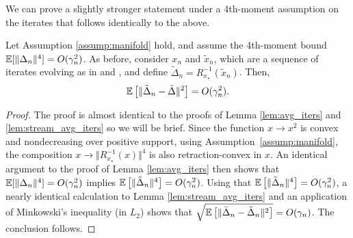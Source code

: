 We can prove a slightly stronger statement under a 4th-moment assumption on the iterates that follows identically to the above.
\begin{lemma} \label{lem:stream_avg_iters_4mom}
  Let Assumption \ref{assump:manifold} hold, and assume the 4th-moment bound $\mathbb{E}[\Vert \Delta_n \Vert^4] = O(\gamma_n^2)$. As before, consider $x_n$ and $\tilde{x}_n$, which are a sequence of iterates evolving as in   and , and define
  $\tilde {\Delta}_{n} = R_{x_\star}^{-1}(\tilde {x}_{n})$. Then,
  \[ \mathbb{E} \left[ \Vert \tilde{\Delta}_n-\bar{\Delta} \Vert^2 \right] = O(\gamma_n^2). \]
\end{lemma}
\begin{proof}
  The proof is almost identical to the proofs of Lemma \ref{lem:avg_iters} and \ref{lem:stream_avg_iters} so we will be brief. Since the function $x \to x^2$ is convex
  and nondecreasing over positive support, using Assumption~\ref{assump:manifold}, the composition $x \to \Vert R_{x_\star}^{-1}(x) \Vert^4$ is also retraction-convex in $x$. An identical argument to the proof
  of Lemma \ref{lem:avg_iters} then shows that $\mathbb{E}[\Vert \Delta_n \Vert^4] = O(\gamma_n^2)$ implies $\mathbb{E}\left[\Vert \tilde{\Delta}_n \Vert^4\right] = O(\gamma_n^2)$. Using that $\mathbb{E}\left[\Vert \tilde{\Delta}_n \Vert^4\right] = O(\gamma_n^2)$, a nearly identical calculation
  to Lemma \ref{lem:stream_avg_iters} and an application of Minkowski's inequality (in $L_2$) shows that $\sqrt{\mathbb{E} \left[\Vert \bar{\Delta}_n - \tilde{\Delta}_n \Vert^2\right]} = O(\gamma_n)$. The conclusion follows.
\end{proof}
